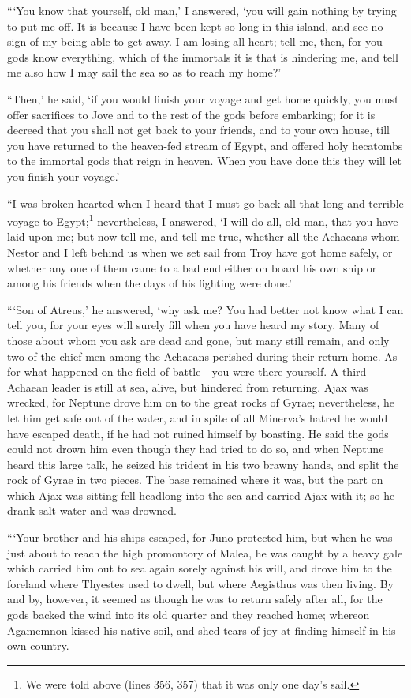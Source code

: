 “‘You know that yourself, old man,’ I answered, ‘you will gain nothing by
trying to put me off. It is because I have been kept so long in this island,
and see no sign of my being able to get away. I am losing all heart; tell me,
then, for you gods know everything, which of the immortals it is that is
hindering me, and tell me also how I may sail the sea so as to reach my home?’

“Then,’ he said, ‘if you would finish your voyage and get home quickly, you
must offer sacrifices to Jove and to the rest of the gods before embarking; for
it is decreed that you shall not get back to your friends, and to your own
house, till you have returned to the heaven-fed stream of Egypt, and offered
holy hecatombs to the immortal gods that reign in heaven. When you have done
this they will let you finish your voyage.’

“I was broken hearted when I heard that I must go back all that long and
terrible voyage to Egypt;\footnote{We were told above (lines 356, 357) that it was only one day’s sail.} nevertheless, I answered, ‘I will do
all, old man, that you have laid upon me; but now tell me, and tell me true,
whether all the Achaeans whom Nestor and I left behind us when we set sail from
Troy have got home safely, or whether any one of them came to a bad end either
on board his own ship or among his friends when the days of his fighting were
done.’

“‘Son of Atreus,’ he answered, ‘why ask me? You had better not know what I can
tell you, for your eyes will surely fill when you have heard my story. Many of
those about whom you ask are dead and gone, but many still remain, and only two
of the chief men among the Achaeans perished during their return home. As for
what happened on the field of battle—you were there yourself. A third Achaean
leader is still at sea, alive, but hindered from returning. Ajax was wrecked,
for Neptune drove him on to the great rocks of Gyrae; nevertheless, he let him
get safe out of the water, and in spite of all Minerva’s hatred he would have
escaped death, if he had not ruined himself by boasting. He said the gods could
not drown him even though they had tried to do so, and when Neptune heard this
large talk, he seized his trident in his two brawny hands, and split the rock
of Gyrae in two pieces. The base remained where it was, but the part on which
Ajax was sitting fell headlong into the sea and carried Ajax with it; so he
drank salt water and was drowned.

“‘Your brother and his ships escaped, for Juno protected him, but when he was
just about to reach the high promontory of Malea, he was caught by a heavy gale
which carried him out to sea again sorely against his will, and drove him to
the foreland where Thyestes used to dwell, but where Aegisthus was then living.
By and by, however, it seemed as though he was to return safely after all, for
the gods backed the wind into its old quarter and they reached home; whereon
Agamemnon kissed his native soil, and shed tears of joy at finding himself in
his own country.


